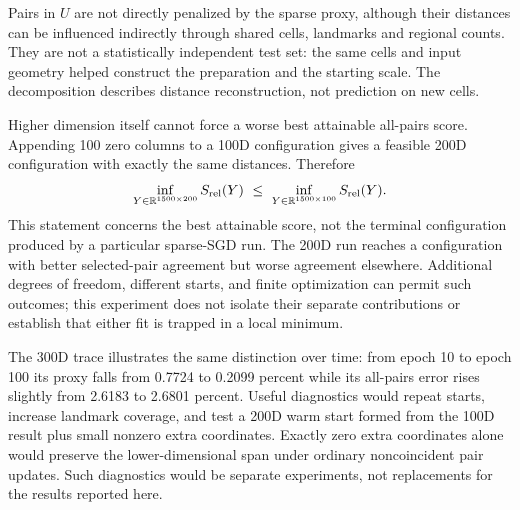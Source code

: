 Pairs in $U$ are not directly penalized by the sparse proxy, although their
distances can be influenced indirectly through shared cells, landmarks
and regional counts. They are not a statistically independent test set:
the same cells and input geometry helped construct the preparation and
the starting scale. The decomposition describes distance reconstruction,
not prediction on new cells.

Higher dimension itself cannot force a worse best attainable all-pairs
score. Appending 100 zero columns to a 100D configuration gives a feasible
200D configuration with exactly the same distances. Therefore
\begin{equation}
\inf_{Y\in\mathbb R^{1500\times200}}S_{\rm rel}(Y)
\ \leq\
\inf_{Y\in\mathbb R^{1500\times100}}S_{\rm rel}(Y).
\end{equation}
This statement concerns the best attainable score, not the terminal
configuration produced by a particular sparse-SGD run. The 200D run
reaches a configuration with better selected-pair agreement but worse
agreement elsewhere. Additional degrees of freedom, different starts,
and finite optimization can permit such outcomes; this experiment does
not isolate their separate contributions or establish that either fit
is trapped in a local minimum.

The 300D trace illustrates the same distinction over time: from epoch 10
to epoch 100 its proxy falls from 0.7724 to 0.2099 percent while its
all-pairs error rises slightly from 2.6183 to 2.6801 percent.
Useful diagnostics would repeat starts, increase landmark coverage, and
test a 200D warm start formed from the 100D result plus small nonzero extra
coordinates. Exactly zero extra coordinates alone would preserve the
lower-dimensional span under ordinary noncoincident pair updates.
Such diagnostics would be separate experiments, not replacements for
the results reported here.
